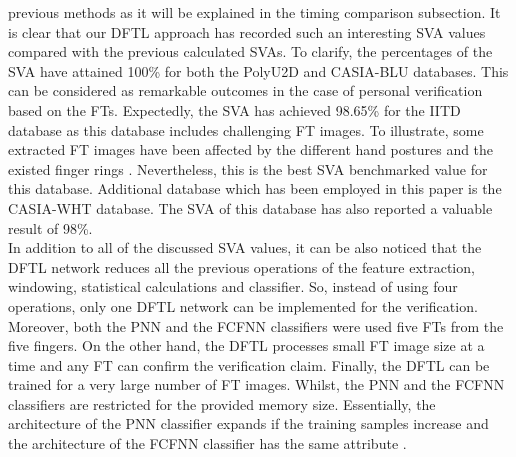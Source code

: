 \documentclass[conference]{IEEEtran}
\begin{document}
previous methods as it will be explained in the timing comparison subsection. It is clear that our DFTL approach has recorded such an interesting SVA values compared with the previous calculated SVAs. To clarify, the percentages of the SVA have attained 100\% for both the PolyU2D and CASIA-BLU databases. This can be considered as remarkable outcomes in the case of personal verification based on the FTs. Expectedly, the SVA has achieved 98.65\% for the IITD database as this database includes challenging FT images. To illustrate, some extracted FT images have been affected by the different hand postures and the existed finger rings \cite{Al-Nima2017efficient}. Nevertheless, this is the best SVA benchmarked value for this database. Additional database which has been employed in this paper is the CASIA-WHT database. The SVA of this database has also reported a valuable result of 98\%. \\
In addition to all of the discussed SVA values, it can be also noticed that the DFTL network reduces all the previous operations of the feature extraction, windowing, statistical calculations and classifier. So, instead of using four operations, only one DFTL network can be implemented for the verification. Moreover, both the PNN and the FCFNN classifiers were used five FTs from the five fingers. On the other hand, the DFTL processes small FT image size at a time and any FT can confirm the verification claim. Finally, the DFTL can be trained for a very large number of FT images. Whilst, the PNN and the FCFNN classifiers are restricted for the provided memory size. Essentially, the architecture of the PNN classifier expands if the training samples increase \cite{shorrock2000biometric} and the architecture of the FCFNN classifier has the same attribute \cite{Al-Nima2017finger}.
\end{document}
